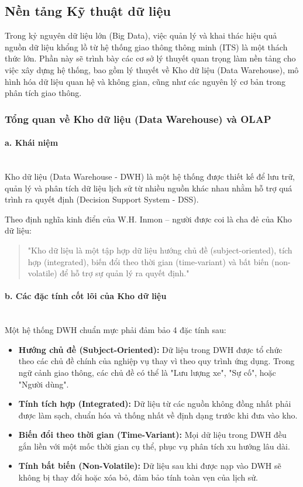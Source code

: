 \subsection{Nền tảng Kỹ thuật dữ liệu}
\label{sec:3_1}

Trong kỷ nguyên dữ liệu lớn (Big Data), việc quản lý và khai thác hiệu quả nguồn dữ liệu khổng lồ từ hệ thống giao thông thông minh (ITS) là một thách thức lớn. Phần này sẽ trình bày các cơ sở lý thuyết quan trọng làm nền tảng cho việc xây dựng hệ thống, bao gồm lý thuyết về Kho dữ liệu (Data Warehouse), mô hình hóa dữ liệu quan hệ và không gian, cũng như các nguyên lý cơ bản trong phân tích giao thông.

\subsubsection{Tổng quan về Kho dữ liệu (Data Warehouse) và OLAP}

\paragraph{a. Khái niệm} \mbox{} \\
Kho dữ liệu (Data Warehouse - DWH) là một hệ thống được thiết kế để lưu trữ, quản lý và phân tích dữ liệu lịch sử từ nhiều nguồn khác nhau nhằm hỗ trợ quá trình ra quyết định (Decision Support System - DSS).

Theo định nghĩa kinh điển của W.H. Inmon – người được coi là cha đẻ của Kho dữ liệu:
\begin{quote}
"Kho dữ liệu là một tập hợp dữ liệu hướng chủ đề (subject-oriented), tích hợp (integrated), biến đổi theo thời gian (time-variant) và bất biến (non-volatile) để hỗ trợ sự quản lý ra quyết định."
\end{quote}

\paragraph{b. Các đặc tính cốt lõi của Kho dữ liệu} \mbox{} \\
Một hệ thống DWH chuẩn mực phải đảm bảo 4 đặc tính sau:
\begin{itemize}
    \item \textbf{Hướng chủ đề (Subject-Oriented):} Dữ liệu trong DWH được tổ chức theo các chủ đề chính của nghiệp vụ thay vì theo quy trình ứng dụng. Trong ngữ cảnh giao thông, các chủ đề có thể là "Lưu lượng xe", "Sự cố", hoặc "Người dùng".
    \item \textbf{Tính tích hợp (Integrated):} Dữ liệu từ các nguồn không đồng nhất phải được làm sạch, chuẩn hóa và thống nhất về định dạng trước khi đưa vào kho.
    \item \textbf{Biến đổi theo thời gian (Time-Variant):} Mọi dữ liệu trong DWH đều gắn liền với một mốc thời gian cụ thể, phục vụ phân tích xu hướng lâu dài.
    \item \textbf{Tính bất biến (Non-Volatile):} Dữ liệu sau khi được nạp vào DWH sẽ không bị thay đổi hoặc xóa bỏ, đảm bảo tính toàn vẹn của lịch sử.
\end{itemize}

